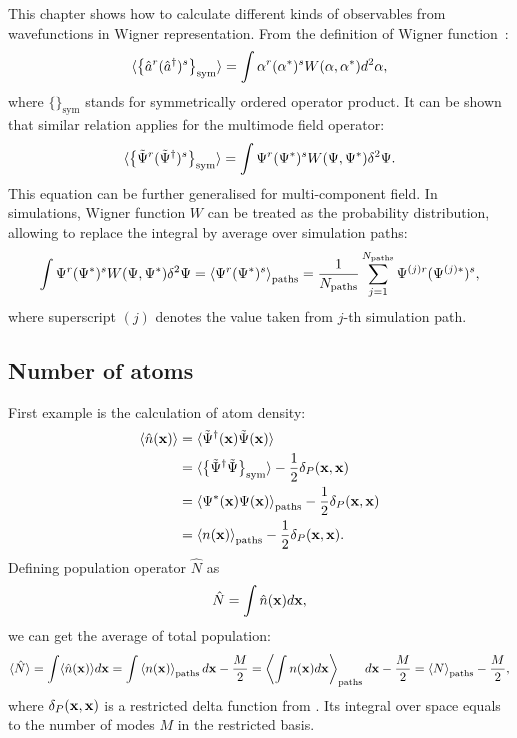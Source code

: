 This chapter shows how to calculate different kinds of observables from wavefunctions in Wigner representation.
From the definition of Wigner function~\cite{Gardiner2004}:
\[
	\langle \left\{  \hat{a}^r ( \hat{a}^\dagger)^s  \right\}_{\mathrm{sym}} \rangle
	= \int \alpha^r (\alpha^*)^s W (\alpha, \alpha^*) d^2\alpha ,
\]
where $\{\}_{\mathrm{sym}}$ stands for symmetrically ordered operator product.
It can be shown that similar relation applies for the multimode field operator:
\[
	\langle \left\{  \tilde{\Psi}^r ( \tilde{\Psi}^\dagger)^s  \right\}_{\mathrm{sym}} \rangle
	= \int \Psi^r (\Psi^*)^s W (\Psi, \Psi^*) \delta^2\Psi.
\]
This equation can be further generalised for multi-component field.
In simulations, Wigner function $W$ can be treated as the probability distribution, allowing to replace the integral by average over simulation paths:
\[
	\int \Psi^r (\Psi^*)^s W (\Psi, \Psi^*) \delta^2\Psi
	= \left\langle  \Psi^r (\Psi^*)^s  \right\rangle_{\mathrm{paths}}
	= \frac{1}{N_{\mathrm{paths}}} \sum\limits_{j=1}^{N_{\mathrm{paths}}}
		\Psi^{(j)r} (\Psi^{(j)*})^s,
\]
where superscript $(j)$ denotes the value taken from $j$-th simulation path.


\subsection{Number of atoms}

First example is the calculation of atom density:
\begin{equation*}
\begin{split}
		\langle \hat{n} (\mathbf{x}) \rangle
		& = \langle \tilde{\Psi}^\dagger (\mathbf{x}) \tilde{\Psi} (\mathbf{x}) \rangle \\
		& = \langle
				\left\{  \tilde{\Psi}^\dagger \tilde{\Psi}  \right\}_{\mathrm{sym}}
			\rangle - \frac{1}{2} \delta_P (\mathbf{x}, \mathbf{x}) \\
		& = \left\langle  \Psi^* (\mathbf{x}) \Psi (\mathbf{x})  \right\rangle_{\mathrm{paths}}
			- \frac{1}{2} \delta_P (\mathbf{x}, \mathbf{x}) \\
		& = \left\langle  n (\mathbf{x})  \right\rangle_{\mathrm{paths}}
			- \frac{1}{2} \delta_P (\mathbf{x}, \mathbf{x}).
\end{split}
\end{equation*}
Defining population operator $\hat{N}$ as
\[
	\hat{N} = \int \hat{n} (\mathbf{x}) d\mathbf{x},
\]
we can get the average of total population:
\[
		\langle \hat{N} \rangle
		= \int \langle \hat{n}(\mathbf{x}) \rangle d\mathbf{x}
		= \int \left\langle  n(\mathbf{x})  \right\rangle_{\mathrm{paths}} d\mathbf{x} - \frac{M}{2}
		= \left\langle  \int n(\mathbf{x}) d\mathbf{x}  \right\rangle_{\mathrm{paths}} d\mathbf{x} - \frac{M}{2}
		= \left\langle N \right\rangle_{\mathrm{paths}} - \frac{M}{2},
\]
where $\delta_P (\mathbf{x}, \mathbf{x})$ is a restricted delta function from .
Its integral over space equals to the number of modes $M$ in the restricted basis.

